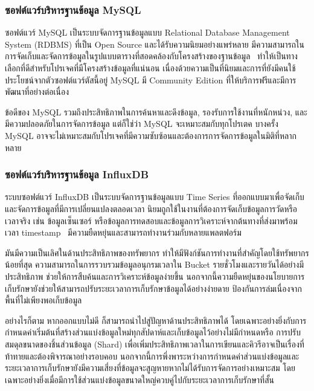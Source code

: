 \documentclass[12pt,one side,openright,a4paper]{cpe-thesis-th}
\newcommand{\thaijustify}[1]{%
  \par\hspace{30pt}\justifying
  #1
}
\begin{document}
        \subsubsection{ซอฟต์แวร์บริหารฐานข้อมูล MySQL}
            \thaijustify{
                ซอฟต์แวร์ MySQL เป็นระบบจัดการฐานข้อมูลแบบ Relational Database Management System (RDBMS) ที่เป็น Open Source และได้รับความนิยมอย่างแพร่หลาย มีความสามารถในการจัดเก็บและจัดการข้อมูลในรูปแบบตารางที่สอดคล้องกับโครงสร้างของฐานข้อมูล~\cite{mysql} ทำให้เป็นทางเลือกที่ดีสำหรับโปรเจคที่มีโครงสร้างข้อมูลที่แน่นอน เนื่องด้วยความเป็นที่นิยมและการที่ยังมีคนใช้ประโยชน์จากตัวซอฟต์แวร์ตัสนี้อยู่ MySQL มี Community Edition ที่ให้บริการฟรีและมีการพัฒนาที่อย่างต่อเนื่อง~\cite{mysqlcomm}
            }
            \thaijustify{
                ข้อดีของ MySQL รวมถึงประสิทธิภาพในการค้นหาและดึงข้อมูล, รองรับการใช้งานที่หนักหน่วง, และมีความปลอดภัยในการจัดการข้อมูล แต่ก็ใช่ว่า MySQL จะเหมาะสมกับทุกโปรเตค  บางครั้ง MySQL อาจจะไม่เหมาะสมกับโปรเจคที่มีความซับซ้อนและต้องการการจัดการข้อมูลในมิติที่หลากหลาย
            }
        \subsubsection{ซอฟต์แวร์บริหารฐานข้อมูล InfluxDB}
            \thaijustify{
                ระบบซอฟต์แวร์ InfluxDB เป็นระบบจัดการฐานข้อมูลแบบ Time Series ที่ออกแบบมาเพื่อจัดเก็บและจัดการข้อมูลที่มีการเปลี่ยนแปลงตลอดเวลา นิยมถูกใช้ในงานที่ต้องการจัดเก็บข้อมูลการวัดหรือเวลาจริง เช่น ข้อมูลเซ็นเซอร์ หรือข้อมูลการทดสอบและข้อมูลการวิเคราะห์จากต้นทางที่ส่งมาพร้อมเวลา timestamp~\cite{influxdb} มีความยืดหยุ่นและสามารถทำงานร่วมกับหลายแพลตฟอร์ม~\cite{influxdb-platforms}
            }
            \thaijustify{
                มันมีความเป็นเลิศในด้านประสิทธิภาพของทรัพยากร ทำให้มีฟังก์ชันการทำงานที่สำคัญโดยใช้ทรัพยากรน้อยที่สุด ความสามารถในการรวบรวมข้อมูลอนุกรมเวลาใน Bucket รายชั่วโมงและรายวันได้อย่างมีประสิทธิภาพ ช่วยให้การสืบค้นและการวิเคราะห์ข้อมูลง่ายขึ้น นอกจากนี้ความยืดหยุ่นของนโยบายการเก็บรักษายังช่วยให้สามารถปรับระยะเวลาการเก็บรักษาข้อมูลได้อย่างง่ายดาย ป้องกันการล่มเนื่องจากพื้นที่ไม่เพียงพอเก็บข้อมูล~\cite{sandholm17influx}
            }
            \thaijustify{
                อย่างไรก็ตาม หากออกแบบไม่ดี ก็สามารถนำไปสู่ปัญหาด้านประสิทธิภาพได้ โดยเฉพาะอย่างยิ่งกับการกำหนดค่าเริ่มต้นที่สร้างส่วนแบ่งข้อมูลใหม่ทุกสัปดาห์และเก็บข้อมูลไว้อย่างไม่มีกำหนดหรือ การปรับสมดุลขนาดของชิ้นส่วนข้อมูล (Shard) เพื่อเพิ่มประสิทธิภาพเวลาในการเขียนและคิวรีอาจเป็นเรื่องที่ท้าทายและต้องพิจารณาอย่างรอบคอบ นอกจากนี้การพึ่งพาระหว่างการกำหนดค่าส่วนแบ่งข้อมูลและระยะเวลาการเก็บรักษายังมีความเสี่ยงที่ข้อมูลจะสูญหายหากไม่ได้รับการจัดการอย่างเหมาะสม โดยเฉพาะอย่างยิ่งเมื่อมีการใช้ส่วนแบ่งข้อมูลขนาดใหญ่ควบคู่ไปกับระยะเวลาการเก็บรักษาที่สั้น~\cite{sandholm17influx}
            }
\end{document}

